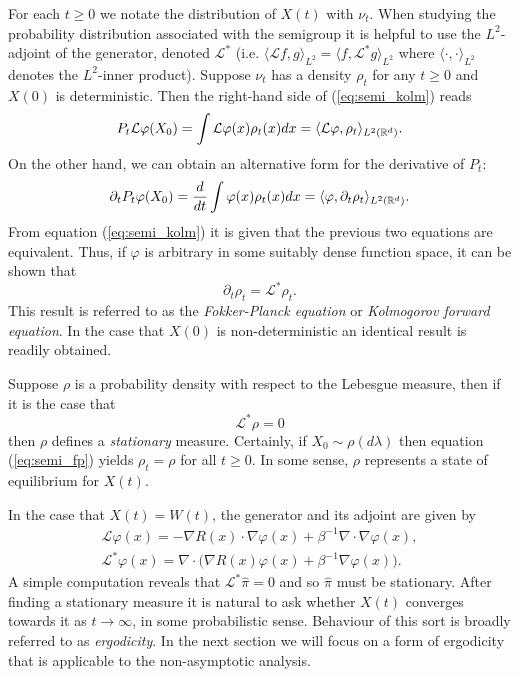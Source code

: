 \documentclass{article}
\newcommand{\Bcal}[1]{\mathcal{#1}}
\begin{document}
\begin{appendices}
For each \(t \geq 0\) we notate the distribution of \(X(t)\) with \(\nu_t\). When studying the probability distribution associated with the semigroup it is helpful to use the \(L^2\)-adjoint of the generator, denoted \(\Bcal{L}^*\) (i.e. \(\langle \Bcal{L}f, g \rangle_{L^2} = \langle f, \Bcal{L}^*g \rangle_{L^2}\) where \(\langle \cdot, \cdot  \rangle_{L^2}\) denotes the \(L^2\)-inner product). Suppose \(\nu_t\) has a density \(\rho_t\) for any \(t \geq 0\) and \(X(0)\) is deterministic. Then the right-hand side of (\ref{eq:semi_kolm}) reads
\begin{equation*}
    P_t \Bcal{L} \varphi(X_0) = \int \Bcal{L}\varphi(x) \rho_t(x) dx = \langle \Bcal{L} \varphi, \rho_t \rangle_{L^2(\Bbb{R}^d)}.
\end{equation*}
On the other hand, we can obtain an alternative form for the derivative of \(P_t\):
\begin{equation*}
    \partial_t P_t \varphi(X_0) = \frac{d}{dt} \int \varphi(x) \rho_t(x) dx = \langle \varphi, \partial_t \rho_t \rangle_{L^2(\Bbb{R}^d)}.
\end{equation*}
From equation (\ref{eq:semi_kolm}) it is given that the previous two equations are equivalent. Thus, if \(\varphi\) is arbitrary in some suitably dense function space, it can be shown that
\begin{equation}\label{eq:semi_fp}
    \partial_t \rho_t = \Bcal{L}^* \rho_t.
\end{equation}
This result is referred to as the \textit{Fokker-Planck equation} or \textit{Kolmogorov forward equation}. In the case that \(X(0)\) is non-deterministic an identical result is readily obtained.

Suppose \(\rho\) is a probability density with respect to the Lebesgue measure, then if it is the case that
\begin{equation*}
    \Bcal{L}^* \rho = 0
\end{equation*}
then \(\rho\) defines a \textit{stationary} measure. Certainly, if \(X_0 \sim \rho(d\lambda)\) then equation (\ref{eq:semi_fp}) yields \(\rho_t = \rho\) for all \(t \geq 0\). In some sense, \(\rho\) represents a state of equilibrium for \(X(t)\).

In the case that \(X(t) = W(t)\), the generator and its adjoint are given by
\begin{gather}\label{eq:semi_adjoint}
    \Bcal{L} \varphi(x) = - \nabla R(x) \cdot \nabla  \varphi(x) + \beta^{-1} \nabla \cdot \nabla \varphi(x),\\
    \Bcal{L}^* \varphi(x) = \nabla \cdot \big ( \nabla R(x) \varphi(x) + \beta^{-1} \nabla \varphi(x)  \big ).\nonumber
\end{gather}
A simple computation reveals that \(\Bcal{L}^* \hat{\pi} = 0\) and so \(\hat{\pi}\) must be stationary. After finding a stationary measure it is natural to ask whether \(X(t)\) converges towards it as \(t \to \infty\), in some probabilistic sense. Behaviour of this sort is broadly referred to as \textit{ergodicity}. In the next section we will focus on a form of ergodicity that is applicable to the non-asymptotic analysis.


\end{appendices}
\end{document}
